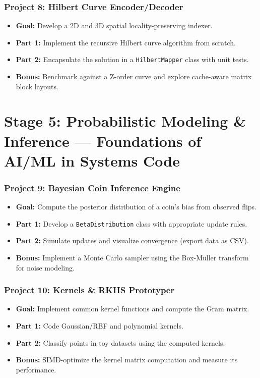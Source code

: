 \documentclass[12pt]{article}
\begin{document}
\subsubsection*{Project 8: Hilbert Curve Encoder/Decoder}
\begin{itemize}[leftmargin=*]
    \item \textbf{Goal:} Develop a 2D and 3D spatial locality-preserving indexer.
    \item \textbf{Part 1:} Implement the recursive Hilbert curve algorithm from scratch.
    \item \textbf{Part 2:} Encapsulate the solution in a \texttt{HilbertMapper} class with unit tests.
    \item \textbf{Bonus:} Benchmark against a Z-order curve and explore cache-aware matrix block layouts.
\end{itemize}

\section{Stage 5: Probabilistic Modeling \& Inference --- Foundations of AI/ML in Systems Code}
\subsubsection*{Project 9: Bayesian Coin Inference Engine}
\begin{itemize}[leftmargin=*]
    \item \textbf{Goal:} Compute the posterior distribution of a coin's bias from observed flips.
    \item \textbf{Part 1:} Develop a \texttt{BetaDistribution} class with appropriate update rules.
    \item \textbf{Part 2:} Simulate updates and visualize convergence (export data as CSV).
    \item \textbf{Bonus:} Implement a Monte Carlo sampler using the Box-Muller transform for noise modeling.
\end{itemize}

\subsubsection*{Project 10: Kernels \& RKHS Prototyper}
\begin{itemize}[leftmargin=*]
    \item \textbf{Goal:} Implement common kernel functions and compute the Gram matrix.
    \item \textbf{Part 1:} Code Gaussian/RBF and polynomial kernels.
    \item \textbf{Part 2:} Classify points in toy datasets using the computed kernels.
    \item \textbf{Bonus:} SIMD-optimize the kernel matrix computation and measure its performance.
\end{itemize}
\end{document}
